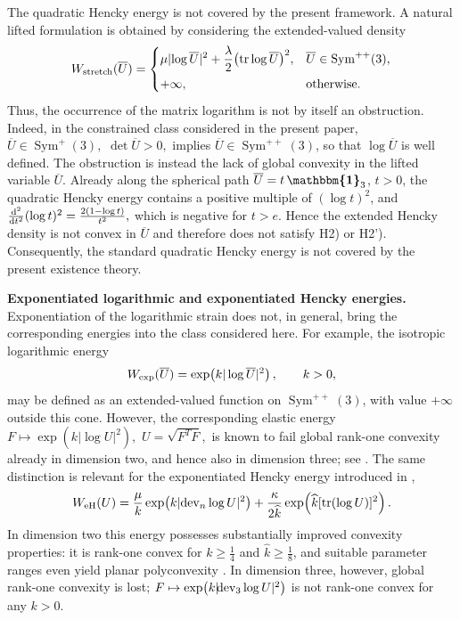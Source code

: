 \documentclass[11pt]{article}
\newcommand{\id}{{\boldsymbol{\mathbbm{1}}}}
\newcommand{\tr}{{\rm tr}}
\newcommand{\dev}{{\rm dev}}
\begin{document}
\begin{itemize}
\item  { 
The quadratic Hencky energy is not covered by the present framework. A
natural lifted formulation is obtained by considering the extended-valued
density
\begin{align}
W_{\rm stretch}(\overline U)
=
\begin{cases}
\displaystyle
\mu |\!\log \overline U|^2
+
\frac{\lambda}{2}
\bigl(\tr\log \overline U\bigr)^2,
&
\overline U\in\operatorname{Sym}^{++}(3),
\\[2mm]
+\infty,
&
\text{otherwise}.
\end{cases}
\end{align}
Thus, the occurrence of the matrix logarithm is not by itself an
obstruction. Indeed, in the constrained class considered in the present
paper,
$
\overline U\in\operatorname{Sym}^{+}(3),
$ $
\det\overline U>0,
$
implies
$\overline U\in\operatorname{Sym}^{++}(3)$, so that
$\log\overline U$ is well defined.
The obstruction is instead the lack of global convexity in the lifted
variable $\overline U$. Already along the spherical path
$\overline U=t\,\id_3$, $t>0$, the quadratic Hencky energy contains a
positive multiple of $(\log t)^2$, and
$
\frac{{\rm d}^2}{{\rm d}t^2}(\log t)^2
=
\frac{2(1-\log t)}{t^2},
$
which is negative for $t>e$. Hence the extended Hencky density is not
convex in $\overline U$ and therefore does not satisfy H2) or H2').
Consequently, the standard quadratic Hencky energy is not covered by the
present existence theory.}
 {\item \textbf{Exponentiated logarithmic and exponentiated Hencky energies.}
Exponentiation of the logarithmic strain does not, in general, bring the
corresponding energies into the class considered here. For example, the
isotropic logarithmic energy
\begin{align}
W_{\rm exp}(\overline U)
=
\exp\!\left(k|\log\overline U|^2\right),
\qquad k>0,
\end{align}
may be defined as an extended-valued function on
$\operatorname{Sym}^{++}(3)$, with value $+\infty$ outside this cone.
However, the corresponding elastic energy
$
F\mapsto
\exp\!\left(k|\log U|^2\right),
$ $
U=\sqrt{F^TF},
$
is known to fail global rank-one convexity already in dimension two,
and hence also in dimension three; see
\cite{NeffGhibaLankeit}.
The same distinction is relevant for the exponentiated Hencky energy
introduced in \cite{NeffGhibaLankeit},
\begin{align}
W_{\rm eH}(U)
=
\frac{\mu}{k}
\exp\!\left(k|\dev_n\log U|^2\right)
+
\frac{\kappa}{2\widehat k}
\exp\!\left(
\widehat k[\tr(\log U)]^2
\right).
\end{align}
In dimension two this energy possesses substantially improved convexity
properties: it is rank-one convex for
$k\geq\frac14$ and $\widehat k\geq\frac18$, and suitable parameter
ranges even yield planar polyconvexity \cite{ghiba2015exponentiated,NeffGhibaPoly}. In dimension three, however,
global rank-one convexity is lost; 
$
F\mapsto
\exp\!\left(k|\!\dev_3\log U|^2\right)
$
is not rank-one convex for any $k>0$.}


\end{itemize}
\end{document}
